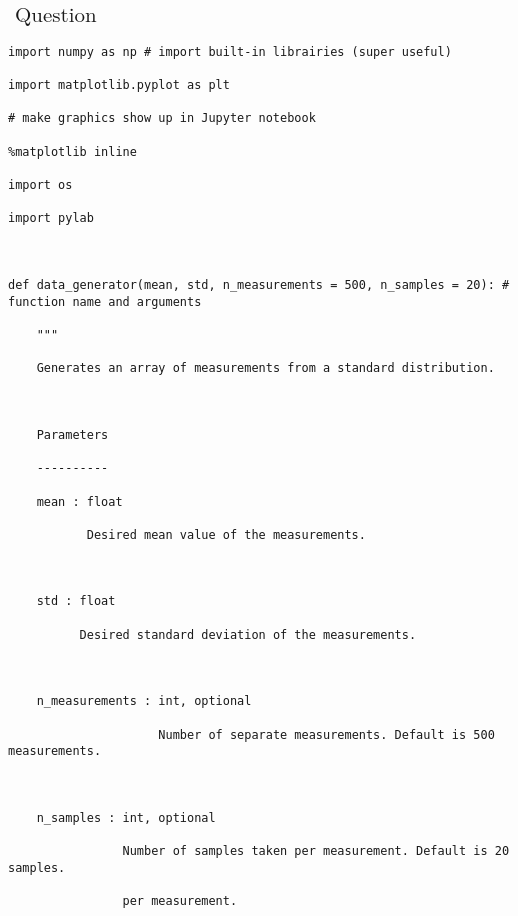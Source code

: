 \documentclass[12pt]{article}
\begin{document}
\begin{center} \section*{$\boxed{\text{ Question  }}$} \end{center} 










\begin{lstlisting}[frame=shadowbox]
import numpy as np # import built-in librairies (super useful)

import matplotlib.pyplot as plt

# make graphics show up in Jupyter notebook

%matplotlib inline 

import os

import pylab



def data_generator(mean, std, n_measurements = 500, n_samples = 20): # function name and arguments

    """

    Generates an array of measurements from a standard distribution.



    Parameters

    ----------

    mean : float

           Desired mean value of the measurements.

           

    std : float

          Desired standard deviation of the measurements.

          

    n_measurements : int, optional

                     Number of separate measurements. Default is 500 measurements.



    n_samples : int, optional

                Number of samples taken per measurement. Default is 20 samples. 

                per measurement.






\end{lstlisting}
\end{document}
